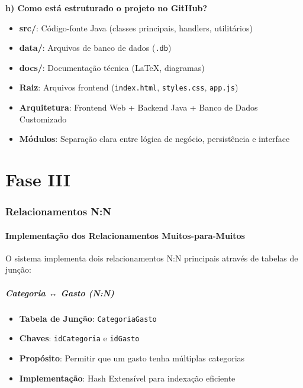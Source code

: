\documentclass[12pt,a4paper]{article}
\begin{document}
\textbf{h) Como está estruturado o projeto no GitHub?}

\begin{itemize}
  \item \textbf{src/}: Código-fonte Java (classes principais, handlers, utilitários)
  \item \textbf{data/}: Arquivos de banco de dados (\texttt{.db})
  \item \textbf{docs/}: Documentação técnica (LaTeX, diagramas)
  \item \textbf{Raiz}: Arquivos frontend (\texttt{index.html}, \texttt{styles.css}, \texttt{app.js})
  \item \textbf{Arquitetura}: Frontend Web + Backend Java + Banco de Dados Customizado
  \item \textbf{Módulos}: Separação clara entre lógica de negócio, persistência e interface
\end{itemize}

\newpage
\part*{Fase III}

\section{Relacionamentos N:N}

\subsection{Implementação dos Relacionamentos Muitos-para-Muitos}

O sistema implementa dois relacionamentos N:N principais através de tabelas de junção:

\subsubsection*{Categoria ↔ Gasto (N:N)}
\begin{itemize}
  \item \textbf{Tabela de Junção}: \texttt{CategoriaGasto}
  \item \textbf{Chaves}: \texttt{idCategoria} e \texttt{idGasto}
  \item \textbf{Propósito}: Permitir que um gasto tenha múltiplas categorias
  \item \textbf{Implementação}: Hash Extensível para indexação eficiente
\end{itemize}
\end{document}
